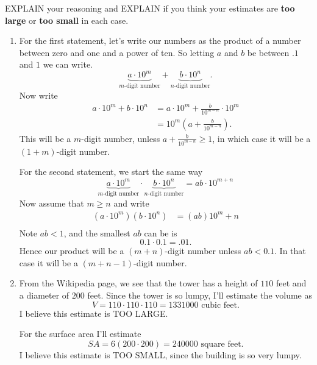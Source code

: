 \documentclass[nooutcomes,noauthor,hints]{ximera}
\begin{document}
\begin{question}
\begin{enumerate}
    EXPLAIN your reasoning and EXPLAIN if you
    think your estimates are \textbf{too large} or \textbf{too small}
    in each case.
  \end{enumerate}
  
  \begin{freeResponse}
    \begin{enumerate}
    \item For the first statement, let's write our numbers as the
      product of a number between zero and one and a power of ten. So
      letting $a$ and $b$ be between $.1$ and $1$ we can write.
      \[
      \underbrace{a\cdot 10^m}_{\text{$m$-digit number}} + \underbrace{b\cdot 10^n}_{\text{$n$-digit number}}.
      \]
      Now write
      \begin{align*}
        a\cdot 10^m + b\cdot 10^n &= a\cdot 10^m + \frac{b}{10^{m-n}}\cdot 10^m \\
        &= 10^m \left(a +\frac{b}{10^{m-n}}\right).
      \end{align*}
      This will be a $m$-digit number, unless $a+\frac{b}{10^{m-n}}\ge 1$, in
      which case it will be a $(1+m)$-digit number.


      For the second statement, we start the same way
      \[
      \underbrace{a\cdot 10^m}_{\text{$m$-digit number}} \cdot \underbrace{b\cdot 10^n}_{\text{$n$-digit number}} = ab\cdot 10^{m+n}
      \]
      Now assume that $m\ge n$ and write
      \begin{align*}
        \left(a\cdot 10^m\right) \left(b\cdot 10^n\right)  &= (ab)10^m+n\\
      \end{align*}
      Note $ab<1$, and the smallest $ab$ can be is
      \[
      0.1\cdot 0.1 = .01.
      \]
      Hence our product will be a $(m+n)$-digit number unless $ab <
      0.1$. In that case it will be a $(m+n-1)$-digit number.
    \item From the Wikipedia page, we see that the tower has a height
      of $110$ feet and a diameter of $200$ feet. Since the tower is so lumpy, I'll estimate the volume as
      \[
      V = 110\cdot 110\cdot 110 = 1331000 \text{ cubic feet}.
      \]
      I believe this estimate is TOO LARGE.

      For the surface area I'll estimate
      \[
      SA = 6(200\cdot 200) = 240000\text{ square feet}.
      \]
      I believe this estimate is TOO SMALL, since the building is so very
      lumpy.
    \end{enumerate}
  \end{freeResponse}
\end{question}
\end{document}
